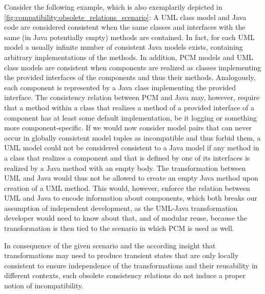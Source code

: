 Consider the following example, which is also exemplarily depicted in \autoref{fig:compatibility:obsolete_relations_scenario}:
A UML class model and Java code are considered consistent when the same classes and interfaces with the same (in Java potentially empty) methods are contained.
In fact, for each UML model a usually infinite number of consistent Java models exists, containing arbitrary implementations of the methods.
In addition, \gls{PCM} models and UML class models are consistent when components are realized as classes implementing the provided interfaces of the components and thus their methods.
Analogously, each component is represented by a Java class implementing the provided interface.
The consistency relation between \gls{PCM} and Java may, however, require that a method within a class that realizes a method of a provided interface of a component has at least some default implementation, be it logging or something more component-specific.
If we would now consider model pairs that can never occur in globally consistent model tuples as incompatible and thus forbid them, a UML model could not be considered consistent to a Java model if any method in a class that realizes a component and that is defined by one of its interfaces is realized by a Java method with an empty body.
The transformation between UML and Java would thus not be allowed to create an empty Java method upon creation of a UML method.
This would, however, enforce the relation between UML and Java to encode information about components, which both breaks our assumption of independent development, as the UML-Java transformation developer would need to know about that, and of modular reuse, because the transformation is then tied to the scenario in which \gls{PCM} is used as well.

In consequence of the given scenario and the according insight that transformations may need to produce transient states that are only locally consistent to ensure independence of the transformations and their reusability in different contexts, such obsolete consistency relations do not induce a proper notion of incompatibility.

